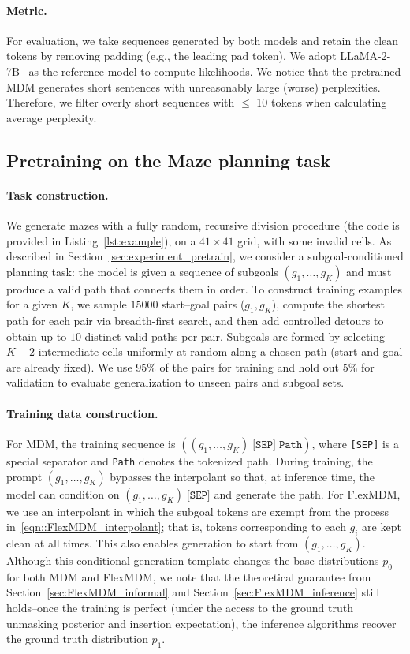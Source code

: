 \paragraph{Metric.}
For evaluation, we take sequences generated by both models and retain the clean tokens by removing padding (e.g., the leading pad token). We adopt LLaMA-2-7B~\citep{touvron2023llama2} as the reference model to compute likelihoods. We notice that the pretrained MDM generates short sentences with unreasonably large (worse) perplexities.  Therefore, we filter overly short sequences with $\le$ 10 tokens when calculating average perplexity.

\subsection{Pretraining on the Maze planning task}
\label{app:maze}
\paragraph{Task construction.}
We generate mazes with a fully random, recursive division procedure (the code is provided in Listing~\ref{lst:example}), on a $41\times 41$ grid, with some invalid cells. As described in Section~\ref{sec:experiment_pretrain}, we consider a subgoal-conditioned planning task: the model is given a sequence of subgoals $(g_1,\dots,g_K)$ and must produce a valid path that connects them in order. To construct training examples for a given $K$, we sample $15000$ start–goal pairs ($g_1,g_K$), compute the shortest path for each pair via breadth-first search, and then add controlled detours to obtain up to $10$ distinct valid paths per pair. Subgoals are formed by selecting $K-2$ intermediate cells uniformly at random along a chosen path (start and goal are already fixed). We use $95\%$ of the pairs for training and hold out $5\%$ for validation to evaluate generalization to unseen pairs and subgoal sets.

\paragraph{Training data construction.}
For MDM, the training sequence is $((g_1,\dots,g_K)\;\texttt{[SEP]}\;\texttt{Path})$,
where \texttt{[SEP]} is a special separator and \texttt{Path} denotes the tokenized path. During training, the prompt $(g_1,\dots,g_K)$ bypasses the interpolant so that, at inference time, the model can condition on $(g_1,\dots,g_K)\;\texttt{[SEP]}$ and generate the path. For FlexMDM, we use an interpolant in which the subgoal tokens are exempt from the process in~\eqref{eqn::FlexMDM_interpolant}; that is, tokens corresponding to each $g_i$ are kept clean at all times. This also enables generation to start from $(g_1,\dots,g_K)$. Although this conditional generation template changes the base distributions $p_0$ for both MDM and FlexMDM, we note that the theoretical guarantee from Section~\ref{sec:FlexMDM_informal} and Section~\ref{sec:FlexMDM_inference} still holds--once the training is perfect (under the access to the ground truth unmasking posterior and insertion expectation), the inference algorithms recover the ground truth distribution $p_1$.

